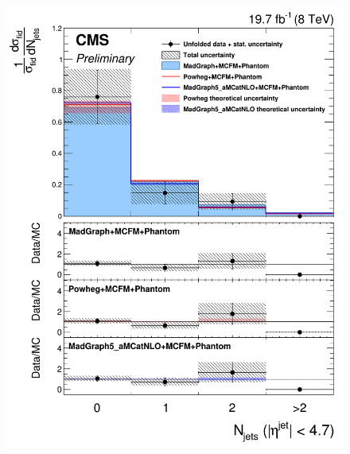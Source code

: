\begin{figure}[hbtp]
\begin{center}
    \includegraphics[width=\cmsFigWidth]{Figures/DiffCrossSecZZTo4eJets_Unfolded_fr_MadGraph_norm.png}     

\end{center}
\end{figure}
